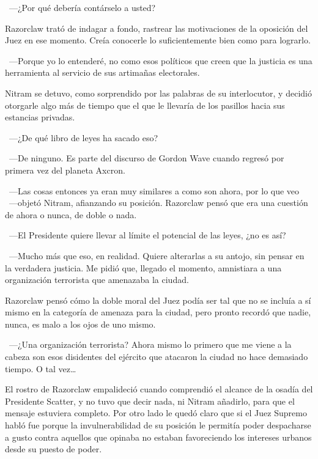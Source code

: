 ~---¿Por qué debería contárselo a usted?

Razorclaw trató de indagar a fondo, rastrear las motivaciones de la oposición del Juez en ese momento. Creía conocerle lo suficientemente bien como para lograrlo.

~---Porque yo lo entenderé, no como esos políticos que creen que la justicia es una herramienta al servicio de sus artimañas electorales.

Nitram se detuvo, como sorprendido por las palabras de su interlocutor, y decidió otorgarle algo más de tiempo que el que le llevaría de los pasillos hacia sus estancias privadas.

~---¿De qué libro de leyes ha sacado eso?

~---De ninguno. Es parte del discurso de Gordon Wave cuando regresó por primera vez del planeta Axcron.

~---Las cosas entonces ya eran muy similares a como son ahora, por lo que veo ~---objetó Nitram, afianzando su posición. Razorclaw pensó que era una cuestión de ahora o nunca, de doble o nada.

~---El Presidente quiere llevar al límite el potencial de las leyes, ¿no es así?

~---Mucho más que eso, en realidad. Quiere alterarlas a su antojo, sin pensar en la verdadera justicia. Me pidió que, llegado el momento, amnistiara a una organización terrorista que amenazaba la ciudad.

Razorclaw pensó cómo la doble moral del Juez podía ser tal que no se incluía a sí mismo en la categoría de amenaza para la ciudad, pero pronto recordó que nadie, nunca, es malo a los ojos de uno mismo.

~---¿Una organización terrorista? Ahora mismo lo primero que me viene a la cabeza son esos disidentes del ejército que atacaron la ciudad no hace demasiado tiempo. O tal vez\dots

El rostro de Razorclaw empalideció cuando comprendió el alcance de la osadía del Presidente Scatter, y no tuvo que decir nada, ni Nitram añadirlo, para que el mensaje estuviera completo. Por otro lado le quedó claro que si el Juez Supremo habló fue porque la invulnerabilidad de su posición le permitía poder despacharse a gusto contra aquellos que opinaba no estaban favoreciendo los intereses urbanos desde su puesto de poder.

